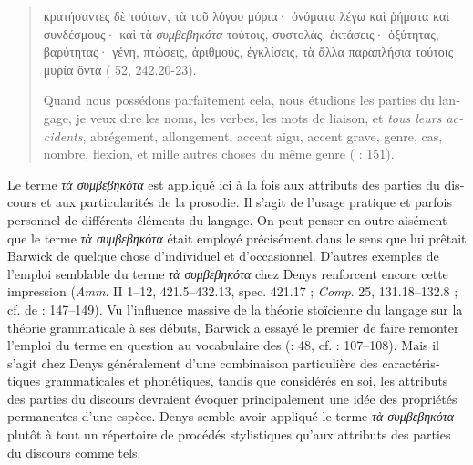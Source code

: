 \documentclass[output=paper]{langsci/langscibook}
\begin{document}
\begin{otherlanguage}{french}
\begin{quote}
    κρατήσαντες δὲ τούτων, τὰ τοῦ λόγου μόρια· ὀνόματα λέγω καὶ ῥήματα καὶ συνδέσμους· καὶ τὰ \textit{συμβεβηκότα} τούτοις, συστολάς, ἐκτάσεις· ὀξύτητας, βαρύτητας· γένη, πτώσεις, ἀριθμούς, ἐγκλίσεις, τὰ ἄλλα παραπλήσια τούτοις μυρία ὄντα ( 52, 242.20-23).
    
    Quand nous possédons parfaitement cela, nous étudions les parties du langage, je veux dire les noms, les verbes, les mots de liaison, et \textit{tous leurs accidents}, abrégement, allongement, accent aigu, accent grave, genre, cas, nombre, flexion, et mille autres choses du même genre (\citealt{aujac_denys_1988} : 151).
\end{quote}

Le terme \textit{τὰ συμβεβηκότα} est appliqué ici à la fois aux attributs des parties du discours et aux particularités de la prosodie. Il s’agit de l’usage pratique et parfois personnel de différents éléments du langage. On peut penser en outre aisément que le terme \textit{τὰ συμβεβηκότα} était employé précisément dans le sens que lui prêtait Barwick de quelque chose d’individuel et d’occasionnel. D’autres exemples de l’emploi semblable du terme \textit{τὰ συμβεβηκότα} chez Denys renforcent encore cette impression (\textit{Amm}. II 1–12, 421.5–432.13, spec. 421.17 ; \textit{Comp}. 25, 131.18–132.8 ; cf. de \citealt{jonge_between_2008}: 147–149). Vu l’influence massive de la théorie stoïcienne du langage sur la théorie grammaticale à ses débuts, Barwick a essayé le premier de faire remonter l’emploi du terme en question au vocabulaire des  (\citealt{barwick_probleme_1957}: 48, cf. \citealt{barwick_remmius_1922}: 107–108). Mais il s’agit chez Denys généralement d’une combinaison particulière des caractéristiques grammaticales et phonétiques, tandis que considérés en soi, les attributs des parties du discours devraient évoquer principalement une idée des propriétés permanentes d’une espèce. Denys semble avoir appliqué le terme \textit{τὰ συμβεβηκότα} plutôt à tout un répertoire de procédés stylistiques qu’aux attributs des parties du discours comme tels. 


\end{otherlanguage}
\end{document}
